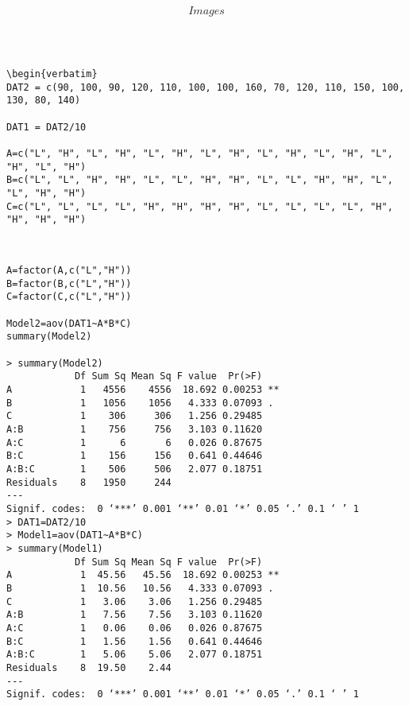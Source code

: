 \documentclass[a4paper,12pt]{article}
\begin{document}
\[Images\]

\newpage

\begin{verbatim}



\begin{verbatim}
DAT2 = c(90, 100, 90, 120, 110, 100, 100, 160, 70, 120, 110, 150, 100, 
130, 80, 140)

DAT1 = DAT2/10

A=c("L", "H", "L", "H", "L", "H", "L", "H", "L", "H", "L", "H", "L", "H", "L", "H")
B=c("L", "L", "H", "H", "L", "L", "H", "H", "L", "L", "H", "H", "L", "L", "H", "H")
C=c("L", "L", "L", "L", "H", "H", "H", "H", "L", "L", "L", "L", "H", "H", "H", "H") 
\end{verbatim}



\begin{verbatim}
    

A=factor(A,c("L","H"))
B=factor(B,c("L","H"))
C=factor(C,c("L","H"))

Model2=aov(DAT1~A*B*C)
summary(Model2)

> summary(Model2)
            Df Sum Sq Mean Sq F value  Pr(>F)   
A            1   4556    4556  18.692 0.00253 **
B            1   1056    1056   4.333 0.07093 . 
C            1    306     306   1.256 0.29485   
A:B          1    756     756   3.103 0.11620   
A:C          1      6       6   0.026 0.87675   
B:C          1    156     156   0.641 0.44646   
A:B:C        1    506     506   2.077 0.18751   
Residuals    8   1950     244                   
---
Signif. codes:  0 ‘***’ 0.001 ‘**’ 0.01 ‘*’ 0.05 ‘.’ 0.1 ‘ ’ 1 
> DAT1=DAT2/10
> Model1=aov(DAT1~A*B*C)
> summary(Model1)
            Df Sum Sq Mean Sq F value  Pr(>F)   
A            1  45.56   45.56  18.692 0.00253 **
B            1  10.56   10.56   4.333 0.07093 . 
C            1   3.06    3.06   1.256 0.29485   
A:B          1   7.56    7.56   3.103 0.11620   
A:C          1   0.06    0.06   0.026 0.87675   
B:C          1   1.56    1.56   0.641 0.44646   
A:B:C        1   5.06    5.06   2.077 0.18751   
Residuals    8  19.50    2.44                   
---
Signif. codes:  0 ‘***’ 0.001 ‘**’ 0.01 ‘*’ 0.05 ‘.’ 0.1 ‘ ’ 1 
\end{verbatim}
\end{document}
